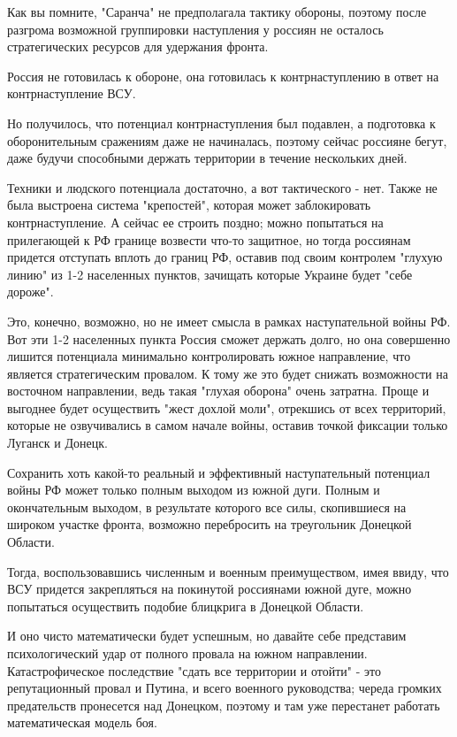Как вы помните, "Саранча" не предполагала тактику обороны, поэтому после
разгрома возможной группировки наступления у россиян не осталось стратегических
ресурсов для удержания фронта.

Россия не готовилась к обороне, она готовилась к контрнаступлению в ответ на
контрнаступление ВСУ.

Но получилось, что потенциал контрнаступления был подавлен, а подготовка к
оборонительным сражениям даже не начиналась, поэтому сейчас россияне бегут,
даже будучи способными держать территории в течение нескольких дней.

Техники и людского потенциала достаточно, а вот тактического - нет. Также не
была выстроена система "крепостей", которая может заблокировать
контрнаступление. А сейчас ее строить поздно; можно попытаться на прилегающей к
РФ границе возвести что-то защитное, но тогда россиянам придется отступать
вплоть до границ РФ, оставив под своим контролем "глухую линию" из 1-2
населенных пунктов, зачищать которые Украине будет "себе дороже".

Это, конечно, возможно, но не имеет смысла в рамках наступательной войны РФ.
Вот эти 1-2 населенных пункта Россия сможет держать долго, но она совершенно
лишится потенциала минимально контролировать южное направление, что является
стратегическим провалом. К тому же это будет снижать возможности на восточном
направлении, ведь такая "глухая оборона" очень затратна. Проще и выгоднее будет
осуществить "жест дохлой моли", отрекшись от всех территорий, которые не
озвучивались в самом начале войны, оставив точкой фиксации только Луганск и
Донецк.

Сохранить хоть какой-то реальный и эффективный наступательный потенциал войны
РФ может только полным выходом из южной дуги. Полным и окончательным выходом, в
результате которого все силы, скопившиеся на широком участке фронта, возможно
перебросить на треугольник Донецкой Области.

Тогда, воспользовавшись численным и военным преимуществом, имея ввиду, что ВСУ
придется закрепляться на покинутой россиянами южной дуге, можно попытаться
осуществить подобие блицкрига в Донецкой Области.

И оно чисто математически будет успешным, но давайте себе представим
психологический удар от полного провала на южном направлении. Катастрофическое
последствие "сдать все территории и отойти" - это репутационный провал и
Путина, и всего военного руководства; череда громких предательств пронесется
над Донецком, поэтому и там уже перестанет работать математическая модель боя.

